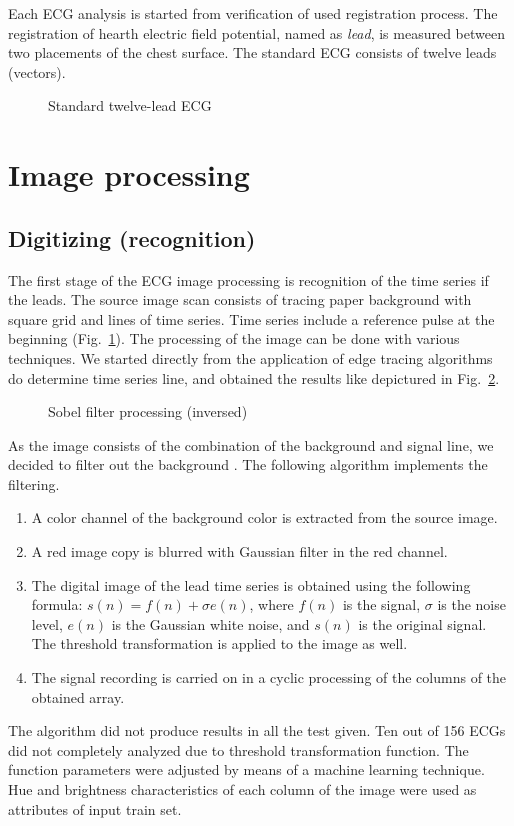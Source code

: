 \documentclass[runningheads]{AIIT}
\newcommand{\nnn}[2][rcolor]{\noindent%
\textcolor{eclr}{}\textcolor{#1}{#2}\textcolor{eclr}{}}
\begin{document}
Each ECG analysis is started from verification of used registration process.  The registration of hearth electric field potential, named as \emph{lead}, is measured between two placements of the chest surface.  The standard ECG consists of twelve leads (vectors).

\begin{figure}[htb]
  \centering

  \caption{Standard twelve-lead ECG}
  \label{fig:leads-ex}
\end{figure}

\section{Image processing}
\label{sec:image-processing}

\subsection{Digitizing (recognition)}
\label{sec:digit-recogn}

The first stage of the ECG image processing is recognition of the time series if the leads.  The source image scan consists of tracing paper background with square grid and lines of time series.  Time series include a reference pulse at the beginning (Fig.~\ref{fig:leads-ex}).  The processing of the image can be done with various techniques.  We started directly from the application of edge tracing algorithms do determine time series line, and obtained the results like depictured in Fig.~\ref{fig:sobel-ex}.

\begin{figure}[htb]
  \centering

  \caption{Sobel filter processing (inversed)}
  \label{fig:sobel-ex}
\end{figure}

As the image consists of the combination of the background and signal line, we decided to filter out the background \cite{1}.  The following algorithm implements the filtering.
\begin{enumerate}
\item A color channel of the background color is extracted from the source image.
\item A red image copy is blurred with Gaussian filter in the red channel.
\item The digital image of the lead time series is obtained using the following formula:
  $s(n)=f(n)+\sigma e(n)$, where $f(n)$ is the signal, $\sigma$ is the
  noise level, $e(n)$ is the Gaussian white noise, and $s(n)$ is the original
  signal.  The threshold transformation is applied to the image as well.
\item The signal recording is carried on in a cyclic processing \nnn{of the columns of the obtained array.}
\end{enumerate}
The algorithm did not produce results in all the test given.  Ten out of 156 ECGs did not completely analyzed due to threshold transformation function.  The function parameters were adjusted by means of a machine learning technique.  Hue and brightness characteristics of each column of the image were used as attributes of input train set.
\end{document}
